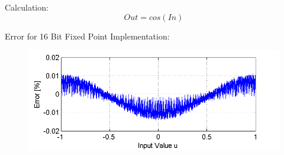 Calculation:
\begin{equation*}
	Out = cos(In)
\end{equation*}

Error for 16 Bit Fixed Point Implementation:
\begin{figure}[H]
	\includegraphics[width=\textwidth]{Cos_Error}
\end{figure}

